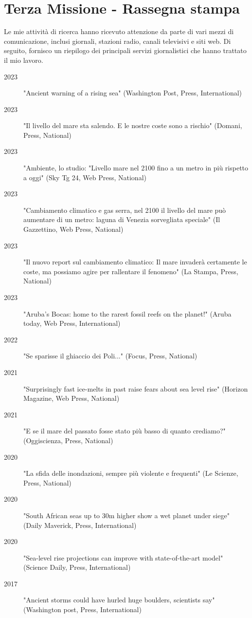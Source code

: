 \documentclass[11pt]{article}
\begin{document}
\newpage
\section{Terza Missione - Rassegna stampa}
{\normalfont Le mie attività di ricerca hanno ricevuto attenzione da parte di vari mezzi di comunicazione, inclusi giornali, stazioni radio, canali televisivi e siti web. Di seguito, fornisco un riepilogo dei principali servizi giornalistici che hanno trattato il mio lavoro.}\\
{\footnotesize 
\begin{description}
  \item [2023] "Ancient warning of a rising sea" (Washington Post, Press, International)
  \item [2023] "Il livello del mare sta salendo. E le nostre coste sono a rischio" (Domani, Press, National) 
  \item [2023] "Ambiente, lo studio: "Livello mare nel 2100 fino a un metro in più rispetto a oggi" (Sky Tg 24, Web Press, National) 
   \item [2023] "Cambiamento climatico e gas serra, nel 2100 il livello del mare può aumentare di un metro: laguna di Venezia sorvegliata speciale" (Il Gazzettino, Web Press, National) 
  \item [2023] "Il nuovo report sul cambiamento climatico: Il mare invaderà certamente le coste, ma possiamo agire per rallentare il fenomeno" (La Stampa, Press, National) 
  \item [2023] "Aruba’s Bocas: home to the rarest fossil reefs on the planet!" (Aruba today, Web Press, International) 
  \item [2022] "Se sparisse il ghiaccio dei Poli..." (Focus, Press, National) 
  \item [2021] "Surprisingly fast ice-melts in past raise fears about sea level rise" (Horizon Magazine, Web Press, National) 
  \item [2021] "E se il mare del passato fosse stato più basso di quanto crediamo?" (Oggiscienza, Press, National) 
  \item [2020] "La sfida delle inondazioni, sempre più violente e frequenti" (Le Scienze, Press, National) 
  \item [2020] "South African seas up to 30m higher show a wet planet under siege" (Daily Maverick, Press, International) 
  \item [2020] "Sea-level rise projections can improve with state-of-the-art model" (Science Daily, Press, International) 
  \item [2017] "Ancient storms could have hurled huge boulders, scientists say" (Washington post, Press, International) 

\end{description}}
\end{document}
